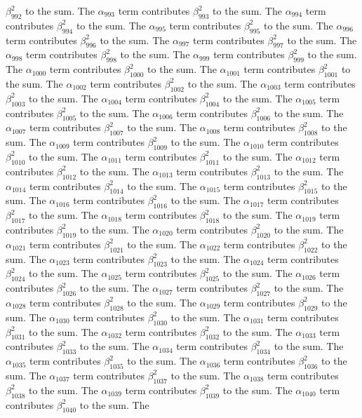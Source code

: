 \begin{lemma}
$\beta_{992}^{2}$ to the sum. The $\alpha_{993}$ term contributes $\beta_{993}^{2}$ to the sum. The $\alpha_{994}$ term contributes $\beta_{994}^{2}$ to the sum. The $\alpha_{995}$ term contributes $\beta_{995}^{2}$ to the sum. The $\alpha_{996}$ term contributes $\beta_{996}^{2}$ to the sum. The $\alpha_{997}$ term contributes $\beta_{997}^{2}$ to the sum. The $\alpha_{998}$ term contributes $\beta_{998}^{2}$ to the sum. The $\alpha_{999}$ term contributes $\beta_{999}^{2}$ to the sum. The $\alpha_{1000}$ term contributes $\beta_{1000}^{2}$ to the sum. The $\alpha_{1001}$ term contributes $\beta_{1001}^{2}$ to the sum. The $\alpha_{1002}$ term contributes $\beta_{1002}^{2}$ to the sum. The $\alpha_{1003}$ term contributes $\beta_{1003}^{2}$ to the sum. The $\alpha_{1004}$ term contributes $\beta_{1004}^{2}$ to the sum. The $\alpha_{1005}$ term contributes $\beta_{1005}^{2}$ to the sum. The $\alpha_{1006}$ term contributes $\beta_{1006}^{2}$ to the sum. The $\alpha_{1007}$ term contributes $\beta_{1007}^{2}$ to the sum. The $\alpha_{1008}$ term contributes $\beta_{1008}^{2}$ to the sum. The $\alpha_{1009}$ term contributes $\beta_{1009}^{2}$ to the sum. The $\alpha_{1010}$ term contributes $\beta_{1010}^{2}$ to the sum. The $\alpha_{1011}$ term contributes $\beta_{1011}^{2}$ to the sum. The $\alpha_{1012}$ term contributes $\beta_{1012}^{2}$ to the sum. The $\alpha_{1013}$ term contributes $\beta_{1013}^{2}$ to the sum. The $\alpha_{1014}$ term contributes $\beta_{1014}^{2}$ to the sum. The $\alpha_{1015}$ term contributes $\beta_{1015}^{2}$ to the sum. The $\alpha_{1016}$ term contributes $\beta_{1016}^{2}$ to the sum. The $\alpha_{1017}$ term contributes $\beta_{1017}^{2}$ to the sum. The $\alpha_{1018}$ term contributes $\beta_{1018}^{2}$ to the sum. The $\alpha_{1019}$ term contributes $\beta_{1019}^{2}$ to the sum. The $\alpha_{1020}$ term contributes $\beta_{1020}^{2}$ to the sum. The $\alpha_{1021}$ term contributes $\beta_{1021}^{2}$ to the sum. The $\alpha_{1022}$ term contributes $\beta_{1022}^{2}$ to the sum. The $\alpha_{1023}$ term contributes $\beta_{1023}^{2}$ to the sum. The $\alpha_{1024}$ term contributes $\beta_{1024}^{2}$ to the sum. The $\alpha_{1025}$ term contributes $\beta_{1025}^{2}$ to the sum. The $\alpha_{1026}$ term contributes $\beta_{1026}^{2}$ to the sum. The $\alpha_{1027}$ term contributes $\beta_{1027}^{2}$ to the sum. The $\alpha_{1028}$ term contributes $\beta_{1028}^{2}$ to the sum. The $\alpha_{1029}$ term contributes $\beta_{1029}^{2}$ to the sum. The $\alpha_{1030}$ term contributes $\beta_{1030}^{2}$ to the sum. The $\alpha_{1031}$ term contributes $\beta_{1031}^{2}$ to the sum. The $\alpha_{1032}$ term contributes $\beta_{1032}^{2}$ to the sum. The $\alpha_{1033}$ term contributes $\beta_{1033}^{2}$ to the sum. The $\alpha_{1034}$ term contributes $\beta_{1034}^{2}$ to the sum. The $\alpha_{1035}$ term contributes $\beta_{1035}^{2}$ to the sum. The $\alpha_{1036}$ term contributes $\beta_{1036}^{2}$ to the sum. The $\alpha_{1037}$ term contributes $\beta_{1037}^{2}$ to the sum. The $\alpha_{1038}$ term contributes $\beta_{1038}^{2}$ to the sum. The $\alpha_{1039}$ term contributes $\beta_{1039}^{2}$ to the sum. The $\alpha_{1040}$ term contributes $\beta_{1040}^{2}$ to the sum. The 
\end{lemma}
